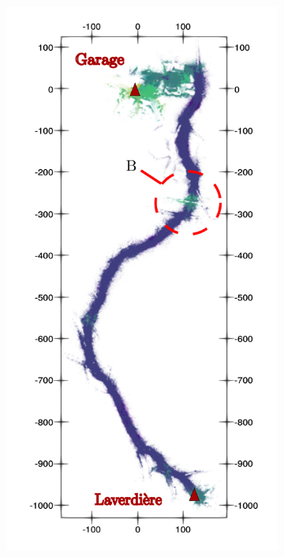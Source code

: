 \begin{figure}[h!]
	\begin{center}
		\begin{subfigure}[b]{0.3\textwidth}
			\includegraphics[width=\linewidth]{figs/forest_canyon/run5_perturbations.pdf}

\end{subfigure}
\end{center}
\end{figure}
